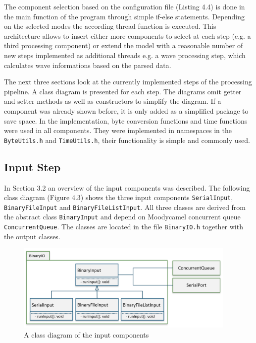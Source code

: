 The component selection based on the configuration file (Listing 4.4) is done in the main function of the program through simple if-else statements. Depending on the selected modes the according thread function is executed. This architecture allows to insert either more components to select at each step (e.g. a third processing component) or extend the model with a reasonable number of new steps implemented as additional threads e.g. a wave processing step, which calculates wave informations based on the parsed data. 

The next three sections look at the currently implemented steps of the processing pipeline. A class diagram is presented for each step. The diagrams omit getter and setter methods as well as constructors to simplify the diagram. If a component was already shown before, it is only added as a simplified package to save space. In the implementation, byte conversion functions and time functions were used in all components. They were implemented in namespaces in the \texttt{ByteUtils.h} and \texttt{TimeUtils.h}, their functionality is simple and commonly used.
\subsection{Input Step}
In Section 3.2 an overview of the input components was described. The following class diagram (Figure 4.3) shows the three input components \texttt{SerialInput}, \texttt{BinaryFileInput} and \texttt{BinaryFileListInput}. All three classes are derived from the abstract class \texttt{BinaryInput} and depend on Moodycamel concurrent queue \texttt{ConcurrentQueue}. The classes are located in the file \texttt{BinaryIO.h} together with the output classes.

\begin{figure}[ht]
\centering
      \includegraphics[width=0.95\textwidth]{input}
        \caption{A class diagram of the input components}
\end{figure}

